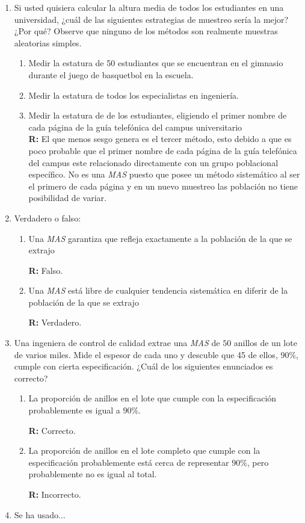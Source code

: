 \documentclass[10pt,a4paper]{book}
\begin{document}
\begin{enumerate}
	\item Si usted quisiera calcular la altura media de todos los estudiantes en una universidad, ¿cuál de las siguientes estrategias de muestreo sería la mejor? ¿Por qué? Observe que ninguno de los métodos son realmente muestras aleatorias simples.
	
	\begin{enumerate}
		\item Medir la estatura de 50 estudiantes que se encuentran en el gimnasio durante el juego de basquetbol en la escuela.
		\item Medir la estatura de todos los especialistas en ingeniería.
		\item Medir la estatura de de los estudiantes, eligiendo el primer nombre de cada página de la guía telefónica del campus universitario\\
		
		\textbf{R:} El que menos sesgo genera es el tercer método, esto debido a que es poco probable que el primer nombre de cada página de la guía telefónica del campus este relacionado directamente con un grupo poblacional específico. No es una \textit{MAS} puesto que posee un método sistemático al ser el primero de cada página y en un nuevo muestreo las población no tiene posibilidad de variar.
	\end{enumerate}
	
	\item Verdadero o falso:
	\begin{enumerate}
		\item Una \textit{MAS} garantiza que refleja exactamente a la población de la que se extrajo
		
		\textbf{R:} Falso.\\
		
		\item Una \textit{MAS} está libre de cualquier tendencia sistemática en diferir de la población de la que se extrajo
		
		\textbf{R:} Verdadero.
	\end{enumerate}
	
	\item Una ingeniera de control de calidad extrae una \textit{MAS} de $ 50 $ anillos de un lote de varios miles. Mide el espesor de cada uno y descuble que 45 de ellos, $ 90\% $, cumple con cierta especificación. ¿Cuál de los siguientes enunciados es correcto?
	
	\begin{enumerate}
		\item La proporción de anillos en el lote que cumple con la especificación probablemente es igual a $ 90\% $.
		
		\textbf{R:} Correcto.
		
		\item La proporción de anillos en el lote completo que cumple con la especificación probablemente está cerca de representar $ 90\% $, pero probablemente no es igual al total.
		
		\textbf{R:} Incorrecto.
	\end{enumerate}
	
	\item Se ha usado...
	
\end{enumerate}
\end{document}

